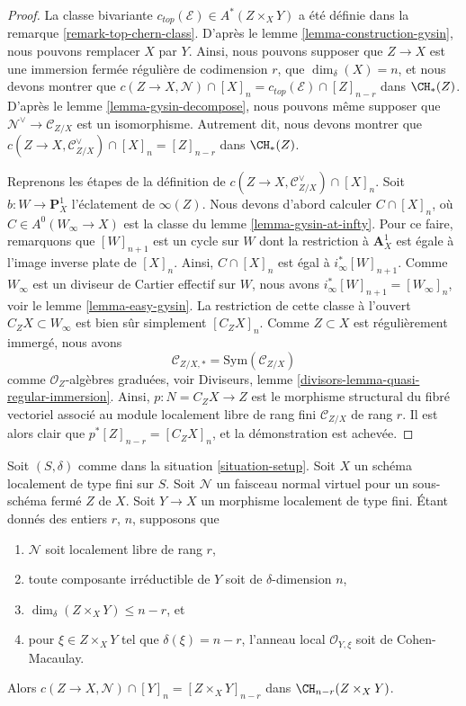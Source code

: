 \begin{proof}
La classe bivariante $c_{top}(\mathcal{E}) \in A^*(Z \times_X Y)$ a été
définie dans la remarque \ref{remark-top-chern-class}.
D'après le lemme \ref{lemma-construction-gysin}, nous pouvons remplacer $X$ par $Y$.
Ainsi, nous pouvons supposer que $Z \to X$ est une immersion fermée régulière
de codimension $r$, que $\dim_\delta(X) = n$, et nous devons
montrer que $c(Z \to X, \mathcal{N}) \cap [X]_n =
c_{top}(\mathcal{E}) \cap [Z]_{n - r}$ dans $\CH_*(Z)$.
D'après le lemme \ref{lemma-gysin-decompose}, nous pouvons même supposer que
$\mathcal{N}^\vee \to \mathcal{C}_{Z/X}$ est un isomorphisme.
Autrement dit, nous devons montrer que
$c(Z \to X, \mathcal{C}_{Z/X}^\vee) \cap [X]_n = [Z]_{n - r}$ dans $\CH_*(Z)$.

\medskip\noindent
Reprenons les étapes de la définition de
$c(Z \to X, \mathcal{C}_{Z/X}^\vee) \cap [X]_n$. Soit
$b : W \to \mathbf{P}^1_X$
l'éclatement de $\infty(Z)$. Nous devons d'abord calculer
$C \cap [X]_n$, où $C \in A^0(W_\infty \to X)$ est
la classe du lemme \ref{lemma-gysin-at-infty}.
Pour ce faire, remarquons que $[W]_{n + 1}$
est un cycle sur $W$ dont la restriction à $\mathbf{A}^1_X$ est
égale à l'image inverse plate de $[X]_n$. Ainsi, $C \cap [X]_n$
est égal à $i_\infty^*[W]_{n + 1}$. Comme $W_\infty$ est un
diviseur de Cartier effectif sur $W$, nous avons
$i_\infty^*[W]_{n + 1} = [W_\infty]_n$, voir le lemme \ref{lemma-easy-gysin}.
La restriction de cette classe à l'ouvert $C_ZX \subset W_\infty$
est bien sûr simplement $[C_ZX]_n$. Comme $Z \subset X$ est régulièrement
immergé, nous avons
$$
\mathcal{C}_{Z/X, *} = \text{Sym}(\mathcal{C}_{Z/X})
$$
comme $\mathcal{O}_Z$-algèbres graduées, voir
Diviseurs, lemme \ref{divisors-lemma-quasi-regular-immersion}.
Ainsi, $p : N = C_ZX \to Z$ est le morphisme structural du
fibré vectoriel associé au module localement libre de rang fini
$\mathcal{C}_{Z/X}$ de rang $r$. Il est alors clair que
$p^*[Z]_{n - r} = [C_ZX]_n$, et la démonstration est achevée.
\end{proof}

\begin{lemma}
\label{lemma-gysin-easy}
Soit $(S, \delta)$ comme dans la situation \ref{situation-setup}. Soit $X$ un schéma
localement de type fini sur $S$. Soit $\mathcal{N}$ un faisceau normal virtuel
pour un sous-schéma fermé $Z$ de $X$. Soit $Y \to X$ un morphisme
localement de type fini. Étant donnés des entiers $r$, $n$, supposons que
\begin{enumerate}
\item $\mathcal{N}$ soit localement libre de rang $r$,
\item toute composante irréductible de $Y$ soit de $\delta$-dimension $n$,
\item $\dim_\delta(Z \times_X Y) \leq n - r$, et
\item pour $\xi \in Z \times_X Y$ tel que $\delta(\xi) = n - r$,
l'anneau local $\mathcal{O}_{Y, \xi}$ soit de Cohen-Macaulay.
\end{enumerate}
Alors $c(Z \to X, \mathcal{N}) \cap [Y]_n = [Z \times_X Y]_{n - r}$
dans $\CH_{n - r}(Z \times_X Y)$.
\end{lemma}

